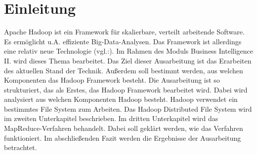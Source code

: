\section{Einleitung}
Apache Hadoop ist ein Framework für skalierbare, verteilt arbeitende Software. Es ermöglicht u.A. effiziente Big-Data-Analysen. Das Framework ist allerdings eine relativ neue Technologie (vgl.:\cite{avn}). Im Rahmen des Moduls \glqq Business Intelligence II. \grqq wird dieses Thema bearbeitet. Das Ziel dieser Ausarbeitung ist das Erarbeiten des aktuellen Stand der Technik. Außerdem soll bestimmt werden, aus welchen Komponenten das Hadoop Framework besteht. Die Ausarbeitung ist so strukturiert, das als Erstes, das Hadoop Framework bearbeitet wird. Dabei wird analysiert aus welchen Komponenten Hadoop besteht. Hadoop verwendet ein bestimmtes File System zum Arbeiten. Das Hadoop Distributed File System wird im zweiten Unterkapitel beschrieben. Im dritten Unterkapitel wird das MapReduce-Verfahren behandelt. Dabei soll geklärt werden, wie das Verfahren funktioniert. Im abschließenden Fazit werden die Ergebnisse der Ausarbeitung betrachtet.